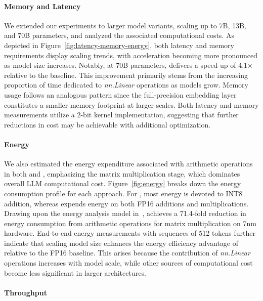 \paragraph{Memory and Latency}

We extended our experiments to larger model variants, scaling up to 7B, 13B, and 70B parameters, and analyzed the associated computational costs. As depicted in Figure~\ref{fig:latency-memory-energy}, both latency and memory requirements display scaling trends, with acceleration becoming more pronounced as model size increases. Notably, at 70B parameters,  delivers a speed-up of 4.1$\times$ relative to the  baseline. This improvement primarily stems from the increasing proportion of time dedicated to \emph{nn.Linear} operations as models grow. Memory usage follows an analogous pattern since the full-precision embedding layer constitutes a smaller memory footprint at larger scales. Both latency and memory measurements utilize a 2-bit kernel implementation, suggesting that further reductions in cost may be achievable with additional optimization.

\paragraph{Energy}

We also estimated the energy expenditure associated with arithmetic operations in both  and , emphasizing the matrix multiplication stage, which dominates overall LLM computational cost. Figure~\ref{fig:energy} breaks down the energy consumption profile for each approach. For , most energy is devoted to INT8 addition, whereas  expends energy on both FP16 additions and multiplications. Drawing upon the energy analysis model in~\cite{energycost, pokebnn},  achieves a 71.4-fold reduction in energy consumption from arithmetic operations for matrix multiplication on 7nm hardware. End-to-end energy measurements with sequences of 512 tokens further indicate that scaling model size enhances the energy efficiency advantage of  relative to the FP16  baseline. This arises because the contribution of \emph{nn.Linear} operations increases with model scale, while other sources of computational cost become less significant in larger architectures.

\paragraph{Throughput}

